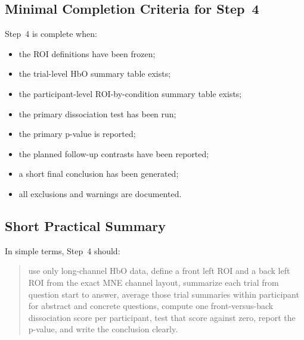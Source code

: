 \documentclass[11pt]{article}
\begin{document}
\subsection{Minimal Completion Criteria for Step~4}
Step~4 is complete when:
\begin{itemize}
    \item the ROI definitions have been frozen;
    \item the trial-level HbO summary table exists;
    \item the participant-level ROI-by-condition summary table exists;
    \item the primary dissociation test has been run;
    \item the primary p-value is reported;
    \item the planned follow-up contrasts have been reported;
    \item a short final conclusion has been generated;
    \item all exclusions and warnings are documented.
\end{itemize}

\subsection{Short Practical Summary}
In simple terms, Step~4 should:
\begin{quote}
use only long-channel HbO data, define a front left ROI and a back left ROI from the exact MNE channel
layout, summarize each trial from question start to answer, average those trial summaries within participant
for abstract and concrete questions, compute one front-versus-back dissociation score per participant,
test that score against zero, report the p-value, and write the conclusion clearly.
\end{quote}
\end{document}
